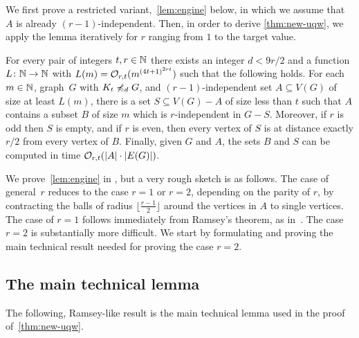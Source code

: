 We first prove a restricted variant,~\cref{lem:engine} below, in which we assume that $A$ is already $(r-1)$-independent. Then, in order to derive
\cref{thm:new-uqw}, we apply the lemma iteratively for $r$ ranging from $1$ to the target value.

\begin{lemma}\label{lem:engine}
For every pair of integers $t,r\in \mathbb{N}$ there exists an integer $d<9r/2$ and a function $L\colon \mathbb{N}\to \mathbb{N}$ with $L(m)=\mathcal{O}_{r,t}{(m^{{(4t+1)}^{2rt}})}$ such that the following holds.
For each $m\in \mathbb{N}$, graph~$G$ with $K_t\not\preccurlyeq_{d} G$, and
$(r-1)$-independent set $A\subseteq V(G)$ of size at least $L(m)$, there is a set $S\subseteq V(G)-A$ of size less than $t$ such that $A$ contains a subset $B$ of size $m$ which is $r$-independent in $G-S$.
Moreover, if $r$ is odd then $S$ is empty, and if $r$ is even,
then every vertex of $S$ is at distance exactly $r/2$ from every vertex of $B$.
Finally, given $G$ and $A$, the sets $B$ and $S$ can be computed in time $\mathcal{O}_{r,t}(|A|\cdot |E(G)|)$.
\end{lemma}

We prove~\cref{lem:engine} in , but  a very rough sketch is as follows.
The  case of general~$r$ reduces to the case $r=1$ or $r=2$, depending on the parity of $r$,
by contracting the balls of radius $\lfloor \frac {r-1} 2\rfloor $ around the vertices in $A$ to single vertices.
The case of $r=1$ follows immediately from Ramsey's theorem, as in~\cite{nevsetvril2011nowhere}.
The case $r=2$ is substantially more difficult.
We start by formulating and proving the main technical result needed for proving the case $r=2$.







\subsection{The main technical lemma}
\label{sec:main-tech}

The following, Ramsey-like result is the main technical lemma used in the proof of~\cref{thm:new-uqw}. 

